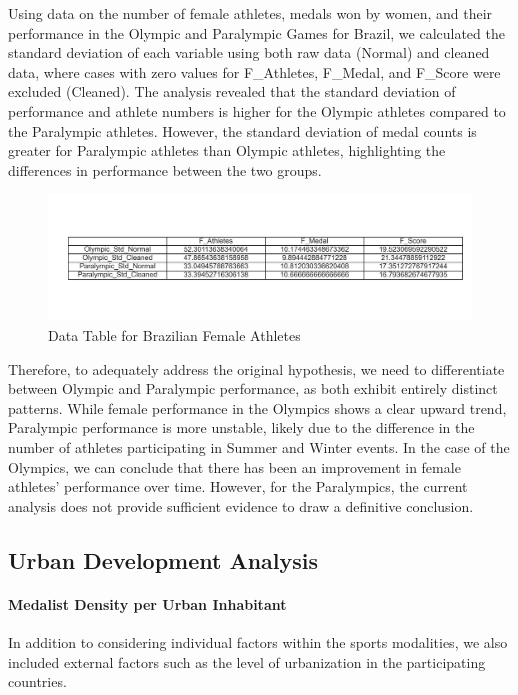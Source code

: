 \documentclass{article}
\begin{document}
Using data on the number of female athletes, medals won by women, and their performance in the Olympic and Paralympic Games for Brazil, we calculated the standard deviation of each variable using both raw data (Normal) and cleaned data, where cases with zero values for F\_Athletes, F\_Medal, and F\_Score were excluded (Cleaned). The analysis revealed that the standard deviation of performance and athlete numbers is higher for the Olympic athletes compared to the Paralympic athletes. However, the standard deviation of medal counts is greater for Paralympic athletes than Olympic athletes, highlighting the differences in performance between the two groups.

\begin{figure}[H]
\centering
\includegraphics[width=1\textwidth]{images/female_participation/table_stds_olympics_and_paralympics_bra.png}
\caption{\label{fig5}Data Table for Brazilian Female Athletes}
\end{figure}

Therefore, to adequately address the original hypothesis, we need to differentiate between Olympic and Paralympic performance, as both exhibit entirely distinct patterns. While female performance in the Olympics shows a clear upward trend, Paralympic performance is more unstable, likely due to the difference in the number of athletes participating in Summer and Winter events. In the case of the Olympics, we can conclude that there has been an improvement in female athletes' performance over time. However, for the Paralympics, the current analysis does not provide sufficient evidence to draw a definitive conclusion.

\subsection{Urban Development Analysis}
\paragraph{Medalist Density per Urban Inhabitant}
In addition to considering individual factors within the sports modalities, we also included external factors such as the level of urbanization in the participating countries. 
\end{document}
